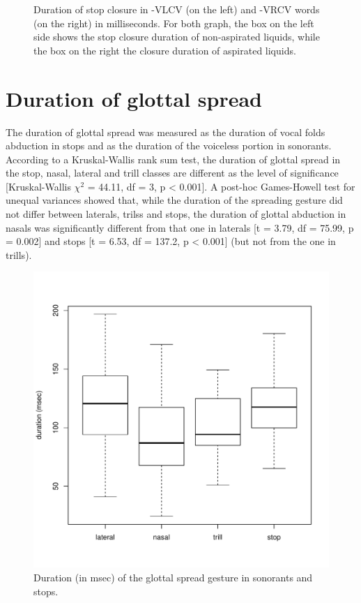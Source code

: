 \documentclass[11pt,a4paper,openany]{memoir}\usepackage[]{graphicx}\usepackage[]{color}
\newenvironment{knitrout}{}{} %
\begin{document}
\begin{figure}
\begin{subfigure}{.5\textwidth}
\begin{knitrout}
\end{knitrout}
\end{subfigure}
\caption{Duration of stop closure in -VLCV (on the left) and -VRCV words (on the right) in milliseconds.
For both graph, the box on the left side shows the stop closure duration of non-aspirated liquids, while the box on the right the closure duration of aspirated liquids.
}
\label{f:diclos}
\end{figure}


\section{Duration of glottal spread}
\label{s:gs}


The duration of glottal spread was measured as the duration of vocal folds abduction in stops and as the duration of the voiceless portion in sonorants.
According to a Kruskal-Wallis rank sum test, the duration of glottal spread in the stop, nasal, lateral and trill classes are different as the level of significance [Kruskal-Wallis $\chi^2$ = 44.11, df = 3, p < 0.001].
A post-hoc Games-Howell test for unequal variances showed that, while the duration of the spreading gesture did not differ between laterals, trilss and stops, the duration of glottal abduction in nasals was significantly different from that one in laterals [t = 3.79, df = 75.99, p = 0.002] and stops [t = 6.53, df = 137.2, p < 0.001] (but not from the one in trills).

\begin{figure}
\centering
\begin{knitrout}
\color{fgcolor}
\includegraphics[width=\textwidth]{img/gs-box-1} 

\end{knitrout}
\caption{Duration (in msec) of the glottal spread gesture in sonorants and stops.}
\label{f:spread-box}
\end{figure}
\end{document}
